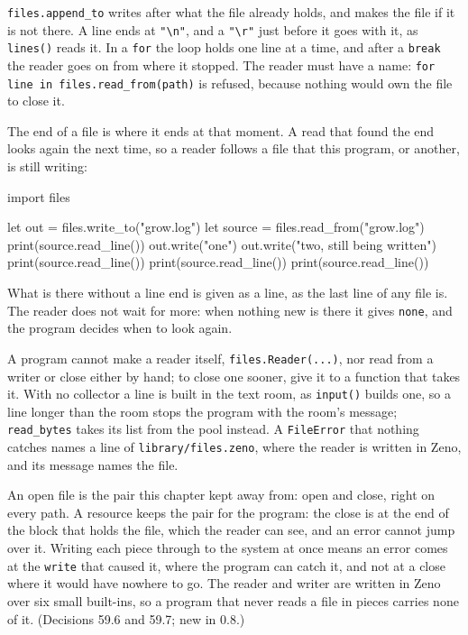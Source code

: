 \verb|files.append_to| writes after what the file already holds, and
makes the file if it is not there. A line ends at \verb|"\n"|, and a
\verb|"\r"| just before it goes with it, as \verb|lines()| reads it.
In a \verb|for| the loop holds one line at a time, and after a
\verb|break| the reader goes on from where it stopped. The reader must
have a name: \verb|for line in files.read_from(path)| is refused,
because nothing would own the file to close it.

The end of a file is where it ends at that moment. A read that found
the end looks again the next time, so a reader follows a file that
this program, or another, is still writing:

\begin{zeno}[file=grow.zeno, dir=pieces]
import files

let out = files.write_to("grow.log")
let source = files.read_from("grow.log")
print(source.read_line())
out.write("one\n")
out.write("two, still being written")
print(source.read_line())
print(source.read_line())
print(source.read_line())
\end{zeno}

What is there without a line end is given as a line, as the last line
of any file is. The reader does not wait for more: when nothing new is
there it gives \verb|none|, and the program decides when to look
again.

A program cannot make a reader itself, \verb|files.Reader(...)|, nor
read from a writer or close either by hand; to close one sooner, give
it to a function that takes it. With no collector a line is built in
the text room, as \verb|input()| builds one, so a line longer than the
room stops the program with the room's message; \verb|read_bytes|
takes its list from the pool instead. A \verb|FileError| that nothing
catches names a line of \verb|library/files.zeno|, where the reader
is written in Zeno, and its message names the file.

\begin{why}
An open file is the pair this chapter kept away from: open and close,
right on every path. A resource keeps the pair for the program: the
close is at the end of the block that holds the file, which the reader
can see, and an error cannot jump over it. Writing each piece through
to the system at once means an error comes at the \verb|write| that
caused it, where the program can catch it, and not at a close where it
would have nowhere to go. The reader and writer are written in Zeno
over six small built-ins, so a program that never reads a file in
pieces carries none of it. (Decisions 59.6 and 59.7; new in 0.8.)
\end{why}

